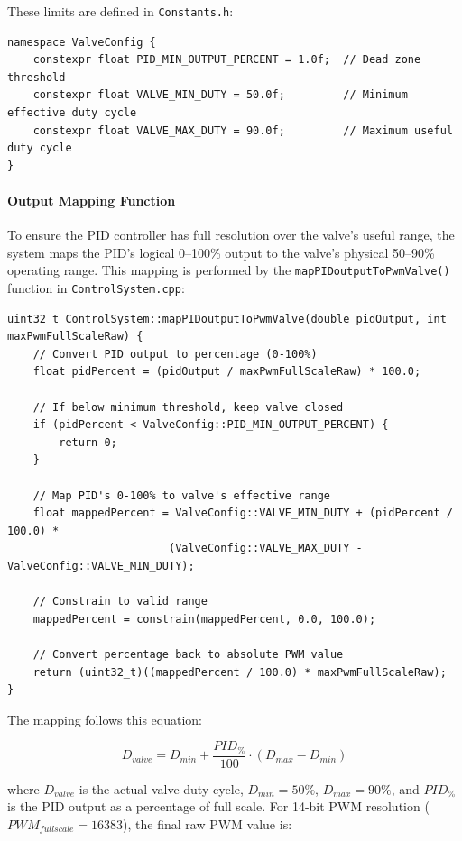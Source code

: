 \documentclass[12pt,a4paper]{article}
\begin{document}
These limits are defined in \texttt{Constants.h}:

\begin{lstlisting}[caption=Valve Operating Range Constants]
namespace ValveConfig {
    constexpr float PID_MIN_OUTPUT_PERCENT = 1.0f;  // Dead zone threshold
    constexpr float VALVE_MIN_DUTY = 50.0f;         // Minimum effective duty cycle
    constexpr float VALVE_MAX_DUTY = 90.0f;         // Maximum useful duty cycle
}
\end{lstlisting}

\paragraph{Output Mapping Function}
To ensure the PID controller has full resolution over the valve's useful range, the system maps the PID's logical 0--100\% output to the valve's physical 50--90\% operating range. This mapping is performed by the \texttt{mapPIDoutputToPwmValve()} function in \texttt{ControlSystem.cpp}:

\begin{lstlisting}[caption=PID Output to Valve PWM Mapping Function]
uint32_t ControlSystem::mapPIDoutputToPwmValve(double pidOutput, int maxPwmFullScaleRaw) {
    // Convert PID output to percentage (0-100%)
    float pidPercent = (pidOutput / maxPwmFullScaleRaw) * 100.0;
    
    // If below minimum threshold, keep valve closed
    if (pidPercent < ValveConfig::PID_MIN_OUTPUT_PERCENT) {
        return 0;
    }
    
    // Map PID's 0-100% to valve's effective range
    float mappedPercent = ValveConfig::VALVE_MIN_DUTY + (pidPercent / 100.0) * 
                         (ValveConfig::VALVE_MAX_DUTY - ValveConfig::VALVE_MIN_DUTY);
    
    // Constrain to valid range
    mappedPercent = constrain(mappedPercent, 0.0, 100.0);
    
    // Convert percentage back to absolute PWM value
    return (uint32_t)((mappedPercent / 100.0) * maxPwmFullScaleRaw);
}
\end{lstlisting}

The mapping follows this equation:

\begin{equation}
D_{valve} = D_{min} + \frac{PID_{\%}}{100} \cdot (D_{max} - D_{min})
\end{equation}

where $D_{valve}$ is the actual valve duty cycle, $D_{min} = 50\%$, $D_{max} = 90\%$, and $PID_{\%}$ is the PID output as a percentage of full scale. For 14-bit PWM resolution ($PWM_{fullscale} = 16383$), the final raw PWM value is:
\end{document}
